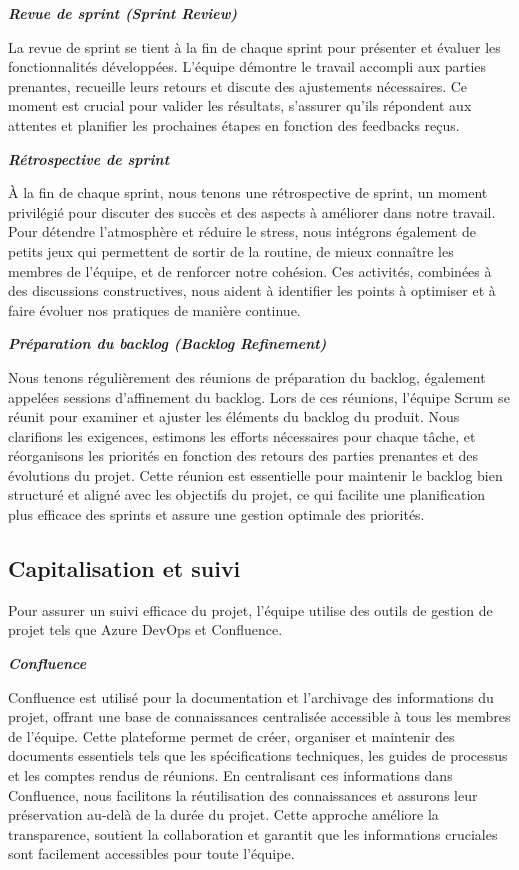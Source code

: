 \textbf{\textbullet \textit{Revue de sprint (Sprint Review) }}

La revue de sprint se tient à la fin de chaque sprint pour présenter et évaluer les fonctionnalités développées. L'équipe démontre le travail accompli aux parties prenantes, recueille leurs retours et discute des ajustements nécessaires. Ce moment est crucial pour valider les résultats, s'assurer qu'ils répondent aux attentes et planifier les prochaines étapes en fonction des feedbacks reçus.

\textbf{\textbullet \textit{Rétrospective de sprint }}

À la fin de chaque sprint, nous tenons une rétrospective de sprint, un moment privilégié pour discuter des succès et des aspects à améliorer dans notre travail. Pour détendre l'atmosphère et réduire le stress, nous intégrons également de petits jeux qui permettent de sortir de la routine, de mieux connaître les membres de l'équipe, et de renforcer notre cohésion. Ces activités, combinées à des discussions constructives, nous aident à identifier les points à optimiser et à faire évoluer nos pratiques de manière continue.

\textbf{\textbullet \textit{Préparation du backlog (Backlog Refinement) }}

Nous tenons régulièrement des réunions de préparation du backlog, également appelées sessions d'affinement du backlog. Lors de ces réunions, l'équipe Scrum se réunit pour examiner et ajuster les éléments du backlog du produit. Nous clarifions les exigences, estimons les efforts nécessaires pour chaque tâche, et réorganisons les priorités en fonction des retours des parties prenantes et des évolutions du projet. Cette réunion est essentielle pour maintenir le backlog bien structuré et aligné avec les objectifs du projet, ce qui facilite une planification plus efficace des sprints et assure une gestion optimale des priorités.


\subsection{Capitalisation et suivi}

Pour assurer un suivi efficace du projet, l'équipe utilise des outils de gestion de projet tels que Azure DevOps et Confluence.

\textbf{\textbullet \textit{ Confluence}}

Confluence est utilisé pour la documentation et l'archivage des informations du projet, offrant une base de connaissances centralisée accessible à tous les membres de l'équipe. Cette plateforme permet de créer, organiser et maintenir des documents essentiels tels que les spécifications techniques, les guides de processus et les comptes rendus de réunions. En centralisant ces informations dans Confluence, nous facilitons la réutilisation des connaissances et assurons leur préservation au-delà de la durée du projet. Cette approche améliore la transparence, soutient la collaboration et garantit que les informations cruciales sont facilement accessibles pour toute l'équipe.

